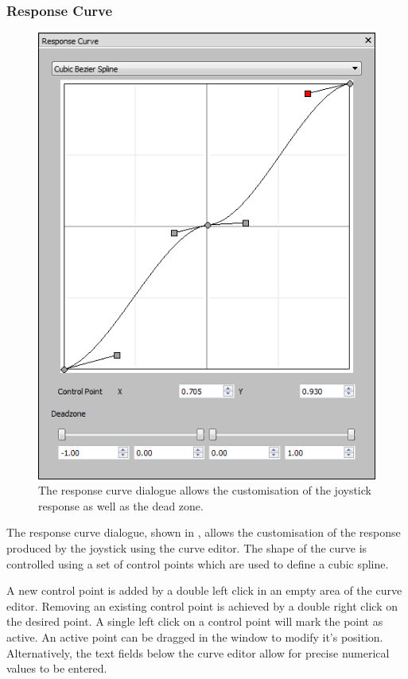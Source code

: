 \documentclass[a4, 10pt]{article}
\begin{document}
\subsubsection{Response Curve}

\begin{figure}[bt]
    \centering

    \includegraphics[width=0.75\linewidth]{images/action_response_curve_bezier}
    \caption{The response curve dialogue allows the customisation of the
        joystick response as well as the dead zone.}
    \label{fig:action_response_curve}
\end{figure}

The response curve dialogue, shown in ,
allows the customisation of the response produced by the joystick using
the curve editor. The shape of the curve is controlled using a set of
control points which are used to define a cubic spline.

A new control point is added by a double left click in an empty area of
the curve editor. Removing an existing control point is achieved by a
double right click on the desired point. A single left click on a
control point will mark the point as active. An active point can be
dragged in the window to modify it's position. Alternatively, the text
fields below the curve editor allow for precise numerical values to be
entered.
\end{document}
